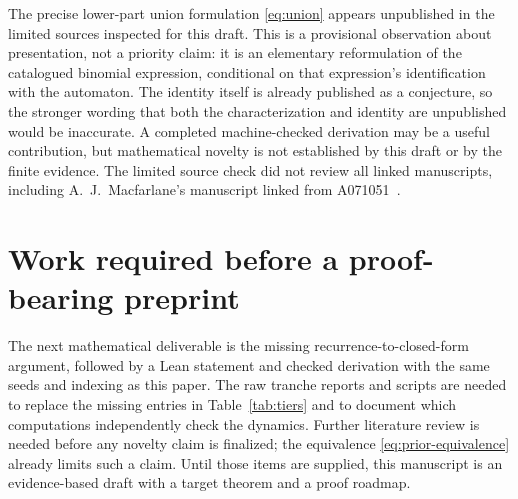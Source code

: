 \documentclass[11pt]{article}
\begin{document}
The precise lower-part union formulation \eqref{eq:union} appears
unpublished in the limited sources inspected for this draft. This is a
provisional observation about presentation, not a priority claim: it is an
elementary reformulation of the catalogued binomial expression, conditional
on that expression's identification with the automaton. The identity
itself is already published as a conjecture, so the stronger wording that
both the characterization and identity are unpublished would be
inaccurate. A completed machine-checked derivation may be a useful
contribution, but mathematical novelty is not established by this draft or
by the finite evidence. The limited source check did not review all linked
manuscripts, including A.\ J.\ Macfarlane's manuscript linked from
A071051~\cite{oeis071051}.

\section{Work required before a proof-bearing preprint}

The next mathematical deliverable is the missing recurrence-to-closed-form
argument, followed by a Lean statement and checked derivation with the
same seeds and indexing as this paper. The raw tranche reports and scripts
are needed to replace the missing entries in Table~\ref{tab:tiers} and to
document which computations independently check the dynamics. Further
literature review is needed before any novelty claim is finalized; the
equivalence \eqref{eq:prior-equivalence} already limits such a claim.
Until those items are supplied, this manuscript is an
evidence-based draft with a target theorem and a proof roadmap.
\end{document}
